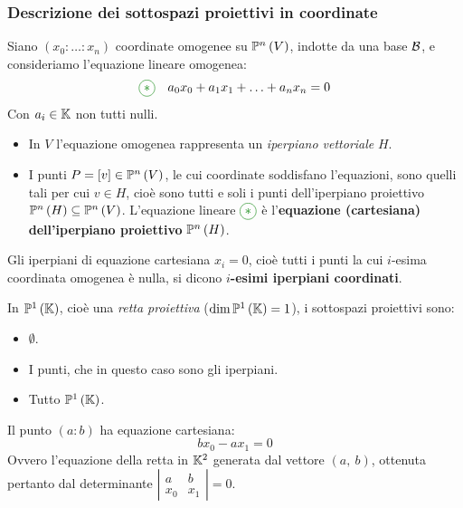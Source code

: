 \subsubsection{Descrizione dei sottospazi proiettivi in coordinate}
Siano $\left(x_0\colon\ldots\colon x_n\right)$ coordinate omogenee su $\proj{V}$, indotte da una base $\mathcal{B}$, e consideriamo l'equazione lineare omogenea:
\begin{equation*}
	\textcolor{green}{\circled{\ast}}\quad a_0x_0+a_1x_1+\ldots+a_nx_n=0
\end{equation*}
Con $a_i\in\mathbb{K}$ non tutti nulli.
\begin{itemize}
	\item In $V$ l'equazione omogenea rappresenta un \textit{iperpiano vettoriale} $H$.
	\item I punti $P=\left[v\right]\in\proj{V}$, le cui coordinate soddisfano l'equazioni, sono quelli tali per cui $v\in H$, cioè sono tutti e soli i punti dell'iperpiano proiettivo $\proj{H}\subseteq\proj{V}$. L'equazione lineare $\textcolor{green}{\circled{\ast}}$ è l'\textbf{equazione (cartesiana) dell'iperpiano proiettivo} $\proj{H}$.
\end{itemize}
\begin{define}
	Gli iperpiani di equazione cartesiana $x_i=0$, cioè tutti i punti la cui $i$-esima coordinata omogenea è nulla, si dicono $i$\textbf{-esimi iperpiani coordinati}.
\end{define}
\begin{example}\item
	In $\proj[1]{\kamp}$, cioè una \textit{retta proiettiva} ($\dim \proj[1]{\kamp}=1$), i sottospazi proiettivi sono:
	\begin{itemize}
		\item $\emptyset$.
		\item I punti, che in questo caso sono gli iperpiani.
		\item Tutto $\proj[1]{\kamp}$.
	\end{itemize}
Il punto $\left(a\colon b\right)$ ha equazione cartesiana:
\begin{equation}
	bx_0-ax_1=0
\end{equation}
Ovvero l'equazione della retta in $\mathbb{K}^2$ generata dal vettore $\left(a,\ b\right)$, ottenuta pertanto dal determinante $\left| \begin{array}{cc}
	a & b \\
	x_0 & x_1
\end{array} \right|=0$.
\end{example}
